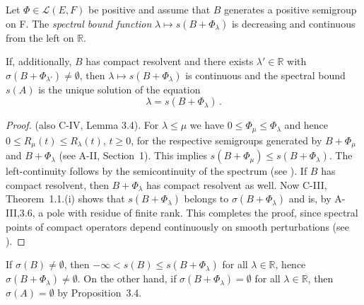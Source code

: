 \begin{proposition}\label{prop:b4-3.6}
	Let $\Phi \in \mathcal{L}(E,F)$ be positive and assume that $B$ generates a positive semigroup on F. 
    The \emph{spectral bound function} $\lambda \mapsto s(B + \Phi_\lambda)$ is decreasing and continuous from the left on $\mathbb{R}$.
	
	If, additionally, $B$ has compact resolvent and there exists $\lambda' \in \mathbb{R}$ with $\sigma(B + \Phi_{\lambda'}) \neq \emptyset$, then $\lambda \mapsto s(B + \Phi_\lambda)$ is continuous and the spectral bound $s(A)$ is the unique solution of the equation
	\begin{equation}\label{eq:b4-3.5}
		\lambda = s(B + \Phi_\lambda)\,.
	\end{equation}
\end{proposition}
\begin{proof} (\cf also C-IV, Lemma 3.4). 
For $\lambda \leq \mu$ we have $0 \leq \Phi_\mu \leq \Phi_\lambda$ and hence $0 \leq R_\mu(t) \leq R_\lambda(t)$, 
$t \geq 0$, for the respective semigroups generated by $B + \Phi_\mu$ and $B + \Phi_\lambda$ (see A-II, Section~1). 
This implies $s(B + \Phi_\mu) \leq s(B + \Phi_\lambda)$. 
The left-continuity follows by the semicontinuity of the spectrum (see 
\citet[Chapter~IV, Theorem~3.1]{kato:1966}). 
If $B$ has compact resolvent, then $B + \Phi_\lambda$ has compact resolvent as well. 
Now C-III, Theorem~1.1.(i) shows that $s(B + \Phi_\lambda)$ belongs to $\sigma(B + \Phi_\lambda)$ and is, by A-III,3.6, a pole with residue of finite rank. 
This completes the proof, since spectral points of compact operators depend continuously on smooth perturbations (see \citet[VII,6.Theorem~9]{dunfordschwartz:1958}).
\end{proof}

If $\sigma(B) \neq \emptyset$, then $-\infty < s(B) \leq s(B + \Phi_\lambda)$ for all $\lambda \in \mathbb{R}$, 
hence $\sigma(B + \Phi_\lambda) \neq \emptyset$. 
On the other hand, if $\sigma(B + \Phi_\lambda) = \emptyset$ for all $\lambda \in \mathbb{R}$,  then $\sigma(A) = \emptyset$ by Proposition~3.4.

